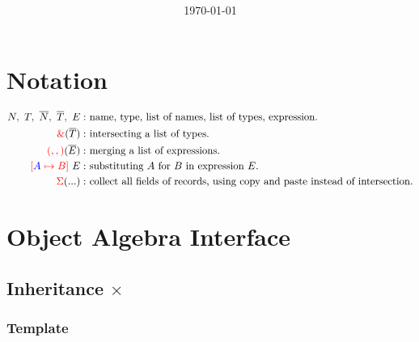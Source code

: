 \documentclass{article}
\title{\huge\textmd{\bf\thistitle}}
\date{}
\author{\today}
\newcommand{\red}[1]{\textcolor{red}{#1}}
\newcommand{\blue}[1]{\textcolor{blue}{#1}}
\begin{document}
\begin{spacing}{1.1}
\maketitle \thispagestyle{empty}


\section*{Notation}

\begin{align*}
N,\ T,\ \overline{N},\ \overline{T},\ E:&\textrm{ name, type, list of names, list of types, expression.}\\
\red{\&}(\overline{T}):&\textrm{ intersecting a list of types.}\\
\red{(,,)}(\overline{E}):&\textrm{ merging a list of expressions.}\\
\red{[}\blue{A}\red{\ \mapsto B]}\ E:&\textrm{ substituting }A\textrm{ for }B\textrm{ in expression }E.\\
\red{\Sigma}(...):&\textrm{ collect all fields of records, using copy and paste instead of intersection.}
\end{align*}

\section{Object Algebra Interface}

\subsection{Inheritance $\times$}

\subsubsection{Template}


\end{spacing}
\end{document}
